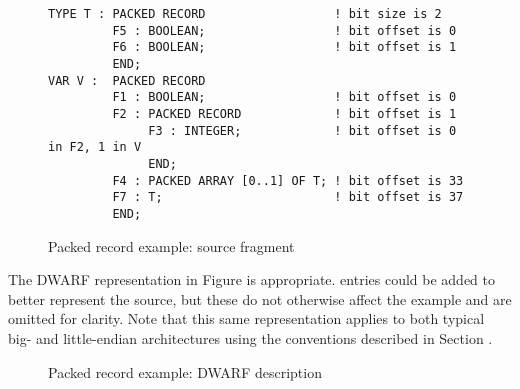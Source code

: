 \begin{figure}[h]
\begin{lstlisting}
TYPE T : PACKED RECORD                  ! bit size is 2
         F5 : BOOLEAN;                  ! bit offset is 0
         F6 : BOOLEAN;                  ! bit offset is 1
         END;
VAR V :  PACKED RECORD
         F1 : BOOLEAN;                  ! bit offset is 0
         F2 : PACKED RECORD             ! bit offset is 1
              F3 : INTEGER;             ! bit offset is 0 in F2, 1 in V
              END;
         F4 : PACKED ARRAY [0..1] OF T; ! bit offset is 33
         F7 : T;                        ! bit offset is 37
         END;
\end{lstlisting}
\caption{Packed record example: source fragment}
\label{fig:packedrecordexamplesourcefragment}
\end{figure}

The DWARF representation in 
Figure  
is appropriate. 
\DWTAGpackedtype{} entries could be added to
better represent the source, but these do not otherwise affect
the example and are omitted for clarity. Note that this same
representation applies to both typical big- and 
little-endian
architectures using the conventions described in 
Section .

\begin{figure}[h]
\caption{Packed record example: DWARF description}
\label{fig:packedrecordexampledwarfdescription}
\end{figure}

